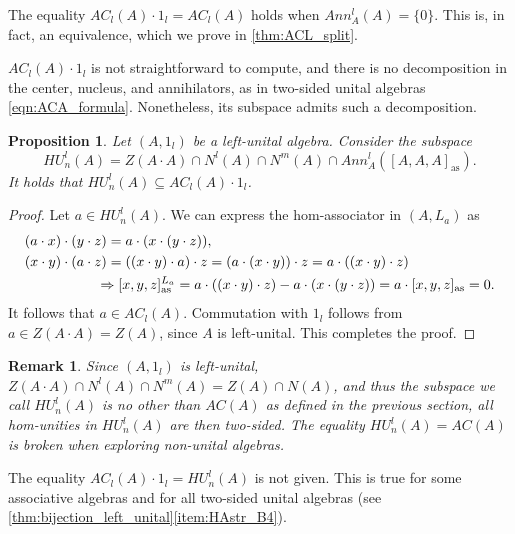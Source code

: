 \documentclass[12pt]{article}
\newtheorem{proposition}[theorem]{Proposition}
\newtheorem{remark}[theorem]{Remark}
\begin{document}
		The equality $AC_l(A)\cdot 1_l=AC_l(A)$ holds when $Ann_ A^l(A)=\{0\}$. This is, in fact, an equivalence, which we prove in \cref{thm:ACL_split}.
		
		$AC_l(A)\cdot 1_l$ is not straightforward to compute, and there is no decomposition in the center, nucleus, and annihilators, as in two-sided unital algebras \eqref{eqn:ACA_formula}. Nonetheless,  its subspace admits such a decomposition.
		
		\begin{proposition}\label{prop:ACL1_subspace}
			Let $(A,1_l)$ be a left-unital algebra. Consider the subspace
			\begin{equation*}
				HU_n^l(A)=Z(A\cdot A)\cap N^l(A)\cap N^m(A)\cap Ann_A^l([A,A,A]_{\mathrm{as}}).
			\end{equation*}
			It holds that $HU_n^l(A)\subseteq AC_l(A)\cdot 1_l$.
		\end{proposition}
		\begin{proof}
			Let $a\in HU_n^l(A)$. We can express the hom-associator in $(A,L_a)$ as
			\begin{align*}
				&(a\cdot x)\cdot (y\cdot z)=a\cdot (x\cdot (y\cdot z)),\\
				&(x\cdot y)\cdot (a\cdot z)=((x\cdot y)\cdot a)\cdot z=(a\cdot (x\cdot y))\cdot z=a\cdot ((x\cdot y)\cdot z) \\
				&\hspace{1.8cm}\Rightarrow [x,y,z]_{\mathrm{as}}^{L_a}=a\cdot ((x\cdot y)\cdot z)-a\cdot (x\cdot (y\cdot z))=a\cdot [x,y,z]_{\mathrm{as}}=0.
			\end{align*}
			It follows that $a\in AC_l(A)$. Commutation with $1_l$ follows from $a\in Z(A\cdot A)=Z(A)$, since $A$ is left-unital. This completes the proof.
		\end{proof}
		\begin{remark}
			Since $(A,1_l)$ is left-unital, $Z(A\cdot A)\cap N^l(A)\cap N^m(A)=Z(A)\cap N(A)$, and thus the subspace we call $HU_n^l(A)$ is no other than $AC(A)$ as defined in the previous section, all hom-unities in $HU_n^l(A)$ are then two-sided. The equality $HU_n^l(A)=AC(A)$ is broken when exploring non-unital algebras.
		\end{remark}
		
		The equality $AC_l(A)\cdot 1_l=HU_n^l(A)$ is not given. This is true for some associative algebras and for all two-sided unital algebras (see  \cref{thm:bijection_left_unital}\ref{item:HAstr_B4}).
		
\end{document}
